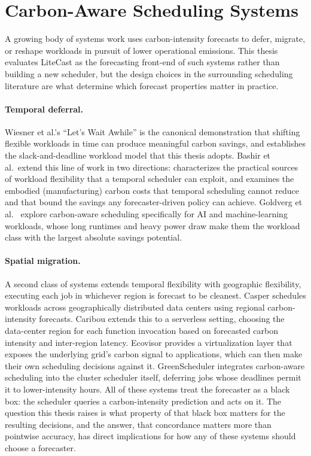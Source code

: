 \section{Carbon-Aware Scheduling Systems}
\label{sec:related-scheduling}

A growing body of systems work uses carbon-intensity forecasts to defer, migrate, or reshape workloads in pursuit of lower operational emissions.
This thesis evaluates LiteCast as the forecasting front-end of such systems rather than building a new scheduler, but the design choices in the surrounding scheduling literature are what determine which forecast properties matter in practice.

\paragraph{Temporal deferral.}
Wiesner et al.'s ``Let's Wait Awhile'' \cite{wiesner_lets_2021} is the canonical demonstration that shifting flexible workloads in time can produce meaningful carbon savings, and establishes the slack-and-deadline workload model that this thesis adopts.
Bashir et al.\ extend this line of work in two directions: \cite{bashir_enabling_2021} characterizes the practical sources of workload flexibility that a temporal scheduler can exploit, and \cite{bashir_sunk_2024} examines the embodied (manufacturing) carbon costs that temporal scheduling cannot reduce and that bound the savings any forecaster-driven policy can achieve.
Goldverg et al.\ \cite{goldverg_towards_nodate} explore carbon-aware scheduling specifically for AI and machine-learning workloads, whose long runtimes and heavy power draw make them the workload class with the largest absolute savings potential.

\paragraph{Spatial migration.}
A second class of systems extends temporal flexibility with geographic flexibility, executing each job in whichever region is forecast to be cleanest.
Casper \cite{souza_casper_2023} schedules workloads across geographically distributed data centers using regional carbon-intensity forecasts.
Caribou \cite{gsteiger_caribou_2024} extends this to a serverless setting, choosing the data-center region for each function invocation based on forecasted carbon intensity and inter-region latency.
Ecovisor \cite{souza_ecovisor_2023} provides a virtualization layer that exposes the underlying grid's carbon signal to applications, which can then make their own scheduling decisions against it.
GreenScheduler \cite{maji_green_2024} integrates carbon-aware scheduling into the cluster scheduler itself, deferring jobs whose deadlines permit it to lower-intensity hours.
All of these systems treat the forecaster as a black box: the scheduler queries a carbon-intensity prediction and acts on it.
The question this thesis raises is what property of that black box matters for the resulting decisions, and the answer, that concordance matters more than pointwise accuracy, has direct implications for how any of these systems should choose a forecaster.

